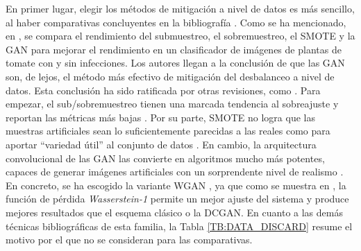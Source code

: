 En primer lugar, elegir los métodos de mitigación a nivel de datos es más sencillo, al haber comparativas concluyentes en la bibliografía \cite{upadhyay2021state,nafi2020addressing}. Como se ha mencionado, en \citet{nafi2020addressing}, se compara el rendimiento del submuestreo, el sobremuestreo, el SMOTE y la GAN para mejorar el rendimiento en un clasificador de imágenes de plantas de tomate con y sin infecciones. Los autores llegan a la conclusión de que las GAN son, de lejos, el método más efectivo de mitigación del desbalanceo a nivel de datos. Esta conclusión ha sido ratificada por otras revisiones, como \citet{johnson2019survey}. Para empezar, el sub/sobremuestreo tienen una marcada tendencia al sobreajuste y reportan las métricas más bajas \cite{johnson2019survey, upadhyay2021state, nafi2020addressing}. Por su parte, SMOTE no logra que las muestras artificiales sean lo suficientemente parecidas a las reales como para aportar ``variedad útil'' al conjunto de datos \cite{nafi2020addressing}. En cambio, la arquitectura convolucional de las GAN las convierte en algoritmos mucho más potentes, capaces de generar imágenes artificiales con un sorprendente nivel de realismo \cite{johnson2019survey}. En concreto, se ha escogido la variante WGAN \cite{arjovsky2017wasserstein}, ya que como se muestra en \citet{nafi2020addressing}, la función de pérdida \textit{Wasserstein-1} permite un mejor ajuste del sistema y produce mejores resultados que el esquema clásico o la DCGAN. En cuanto a las demás técnicas bibliográficas de esta familia, la Tabla \ref{TB:DATA_DISCARD} resume el motivo por el que no se consideran para las comparativas.

